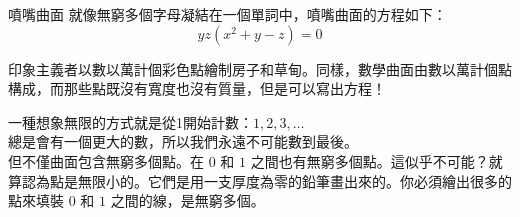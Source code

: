 \begin{surferPage}{噴嘴曲面}
就像無窮多個字母凝結在一個單詞中，噴嘴曲面的方程如下：\\
\smallskip
\[y z (x^2	+ y - z)	= 0\]

\vspace{0.3cm}

印象主義者以數以萬計個彩色點繪制房子和草甸。同樣，數學曲面由數以萬計個點構成，而那些點既沒有寬度也沒有質量，但是可以寫出方程！\\

\vspace{0.3cm}

一種想象無限的方式就是從1開始計數：$1, 2, 3, \dotsc$\\
總是會有一個更大的數，所以我們永遠不可能數到最後。\\

\vspace{0.3cm}
但不僅曲面包含無窮多個點。在 $0$ 和 $1$ 之間也有無窮多個點。這似乎不可能？就算認為點是無限小的。它們是用一支厚度為零的鉛筆畫出來的。你必須繪出很多的點來填裝 $0$ 和 $1$ 之間的線，是無窮多個。
\end{surferPage}
